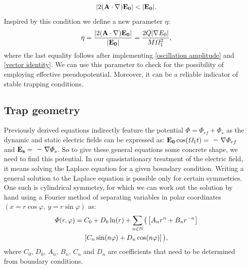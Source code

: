\begin{equation}
	|2(\vb{A} \cdot \nabla)\vb{E_0}| < |\vb{E_0}|.
\end{equation}
Inspired by this condition we define a new parameter $\eta$:
\begin{equation}
	\eta = \dfrac{|2(\vb{A} \cdot \nabla)\vb{E_0}|}{|\vb{E_0}|} = \dfrac{2Q|\nabla E_0|}{M\Omega_1^2},
\end{equation}
where the last equality follows after implementing \eqref{oscillation amplitude} and \eqref{vector identity}. We can use this parameter to check for the possibility of employing effective pseudopotential. Moreover, it can be a reliable indicator of stable trapping conditions.

\subsection{Trap geometry}
Previously derived equations indirectly feature the potential $\Phi = \Phi_{rf} + \Phi_s$ as the dynamic and static electric fields can be expressed as: $\vb{E_0}\cos(\Omega_1 t) = \minus\nabla \Phi_{rf}$ and $\vb{E_s} = \minus\nabla \Phi_s$. So to give these general equations some concrete shape, we need to find this potential. In our quasistationary treatment of the electric field, it means solving the Laplace equation for a given boundary condition. Writing a general solution to the Laplace equation is possible only for certain symmetries. One such is cylindrical symmetry, for which we can work out the solution by hand using a Fourier method of separating variables in polar coordinates $(x=r \cos\varphi, \ y=r \sin\varphi)$ as:
\begin{multline}
	\label{cylindrical symmetry potential}
	\Phi(r, \varphi) = C_0 + D_0 \ln(r) + \sum_{n \in \mathbb{N}} \big( \left[A_n r^{n} + B_n r^{-n} \right] \\ 
	\left[ C_n \sin(n\varphi) + D_n \cos(n\varphi) \right] \big),
\end{multline}
where $C_0$, $D_0$, $A_n$, $B_n$, $C_n$ and $D_n$ are coefficients that need to be determined from boundary conditions. 

